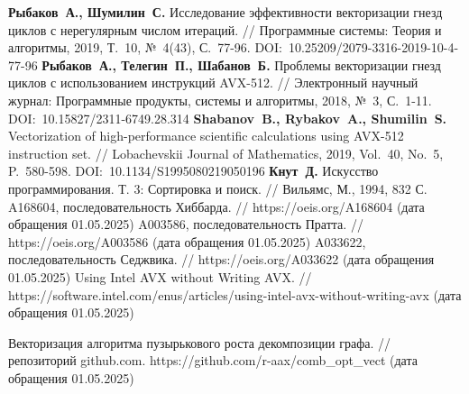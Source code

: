 \begin{thebibliography}{99}
%
\textbf{Рыбаков~А., Шумилин~С.} Исследование эффективности векторизации гнезд циклов с нерегулярным числом итераций. // Программные системы: Теория и алгоритмы, 2019, Т.~10, №~4(43), С.~77-96. DOI:~10.25209/2079-3316-2019-10-4-77-96
%
%
\textbf{Рыбаков~А., Телегин~П., Шабанов~Б.} Проблемы векторизации гнезд циклов с использованием инструкций AVX-512. // Электронный научный журнал: Программные продукты, системы и алгоритмы, 2018, №~3, С.~1-11. DOI:~10.15827/2311-6749.28.314
%
\textbf{Shabanov~B., Rybakov~A., Shumilin~S.} Vectorization of high-performance scientific calculations using AVX-512 instruction set. // Lobachevskii Journal of Mathematics, 2019, Vol.~40, No.~5, P.~580-598. DOI:~10.1134/S1995080219050196
%
\textbf{Кнут~Д.} Искусство программирования. Т. 3: Сортировка и поиск. // Вильямс, М., 1994, 832 С.
%
A168604, последовательность Хиббарда. // https://oeis.org/A168604 (дата обращения 01.05.2025)
%
A003586, последовательность Пратта. // https://oeis.org/A003586 (дата обращения 01.05.2025)
%
A033622, последовательность Седжвика. // https://oeis.org/A033622 (дата обращения 01.05.2025)
%
Using Intel AVX without Writing AVX. // https://software.intel.com/enus/articles/using-intel-avx-without-writing-avx (дата обращения 01.05.2025)
%



%
Векторизация алгоритма пузырькового роста декомпозиции графа. // репозиторий github.com. https://github.com/r-aax/comb\_opt\_vect (дата обращения 01.05.2025)
%




\end{thebibliography}